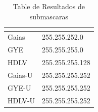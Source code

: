 \documentclass{article}
\begin{document}
\begin{table}[h]
  \caption{Table de Resultados de submascaras}
  \label{tab:}
  \begin{center}
    \begin{tabular}[c]{l|l}
      \hline
      \multicolumn{1}{c|}{\textbf{}} & 
      \multicolumn{1}{c}{\textbf{}} \\
      \hline
       Gaias   & 255.255.252.0 \\
       GYE     & 255.255.255.0 \\
       HDLV    & 255.255.255.128 \\
       Gaias-U & 255.255.255.252 \\
       GYE-U   & 255.255.255.252 \\
       HDLV-U  & 255.255.255.252 \\
      \hline
    \end{tabular}
  \end{center}
\end{table}
\end{document}
